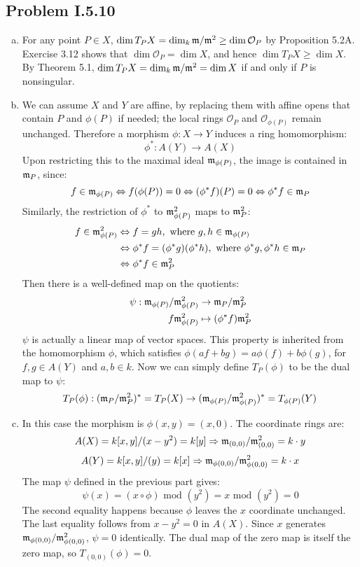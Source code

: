 \documentclass{mathnotes}
\begin{document}
\subsection*{Problem I.5.10}
\begin{enumerate}[(a)]
\item For any point $P\in X$, $\dim T_PX=\dim_k\mathfrak m/\mathfrak m^2\geq\dim \mathcal{O}_P$ by Proposition 5.2A.
        Exercise 3.12 shows that $\dim \mathcal{O}_P=\dim X$, and hence $\dim T_PX\geq \dim X$. By 
        Theorem 5.1, $\dim T_PX=\dim_k\mathfrak m/\mathfrak m^2=\dim X$ if and only if $P$ is nonsingular.
\item We can assume $X$ and $Y$ are affine, by replacing them with affine opens that contain $P$ and $\phi(P)$ if 
	needed; the local rings $\mathcal{O}_P$ and $\mathcal{O}_{\phi(P)}$ remain unchanged. Therefore a 
	morphism $\phi : X \to Y$ induces a ring homomorphism:
	\[	\phi^* : A(Y) \to A(X)	\]
	Upon restricting this to the maximal ideal $\mathfrak m_{\phi(P)}$, the image is contained in $\mathfrak m_{P}$, since:
	\[	f \in \mathfrak m_{\phi(P)} \Leftrightarrow f(\phi(P)) = 0 \Leftrightarrow (\phi^* f)(P) = 0 \Leftrightarrow
	\phi^*f \in \mathfrak m_P	\]
	Similarly, the restriction of $\phi^*$ to $\mathfrak m_{\phi(P)}^2$ maps to $\mathfrak m_{P}^2$:
	\begin{align*}
	f \in \mathfrak m_{\phi(P)}^2 &\Leftrightarrow f = gh, \text{ where } g,h\in \mathfrak m_{\phi(P)} \\
	&\Leftrightarrow \phi^* f = (\phi^* g) (\phi^* h),  \text{ where } \phi^* g, \phi^* h \in \mathfrak m_P \\
	&\Leftrightarrow \phi^* f \in \mathfrak m_P^2
	\end{align*}
	Then there is a well-defined map on the quotients:
	\begin{align*}
	\psi : \mathfrak m_{\phi(P)}/ \mathfrak m_{\phi(P)}^2 &\to \mathfrak m_{P}/ \mathfrak m_{P}^2 \\
	f \mathfrak m_{\phi(P)}^2 &\mapsto (\phi^* f) \mathfrak m_{P}^2
	\end{align*}
	$\psi$ is actually a linear map of vector spaces. This property is inherited from the homomorphism $\phi$, which
	satisfies $\phi(a f + bg) = a \phi(f) + b \phi(g)$, for $f,g \in A(Y)$ and $a,b \in k$. Now we can simply define
	$T_P(\phi)$ to be the dual map to $\psi$:
	\[	T_P(\phi) : (\mathfrak m_{P}/ \mathfrak m_{P}^2)^* = T_P (X) \to (\mathfrak m_{\phi(P)}/ \mathfrak m_{\phi(P)}^2)^* = 
	T_{\phi(P)}( Y)	\]
\item In this case the morphism is $\phi (x,y) = (x,0)$. The coordinate rings are:
	\[	A(X) = k[x,y] / (x-y^2) = k[y] \Rightarrow \mathfrak m_{(0,0)} / \mathfrak m_{(0,0)}^2 = k \cdot y	\]
	\[	A(Y) = k[x,y] / (y) = k[x] \Rightarrow \mathfrak m_{\phi(0,0)} / \mathfrak m_{\phi(0,0)}^2 = k \cdot x	\]
	The map $\psi$ defined in the previous part gives:
	\[	\psi(x) = (x\circ \phi) \text{ mod } (y^2) = x \text{ mod } (y^2) = 0	\]
	The second equality happens because $\phi$ leaves the $x$ coordinate unchanged. The last equality follows
	from $x - y^2 = 0$ in $A(X)$. Since $x$ generates $\mathfrak m_{\phi(0,0)} / \mathfrak m_{\phi(0,0)}^2$, $\psi = 0$ identically.
	The dual map of the zero map is itself the zero map, so $T_{(0,0)} (\phi) = 0$.
\end{enumerate}
\end{document}
